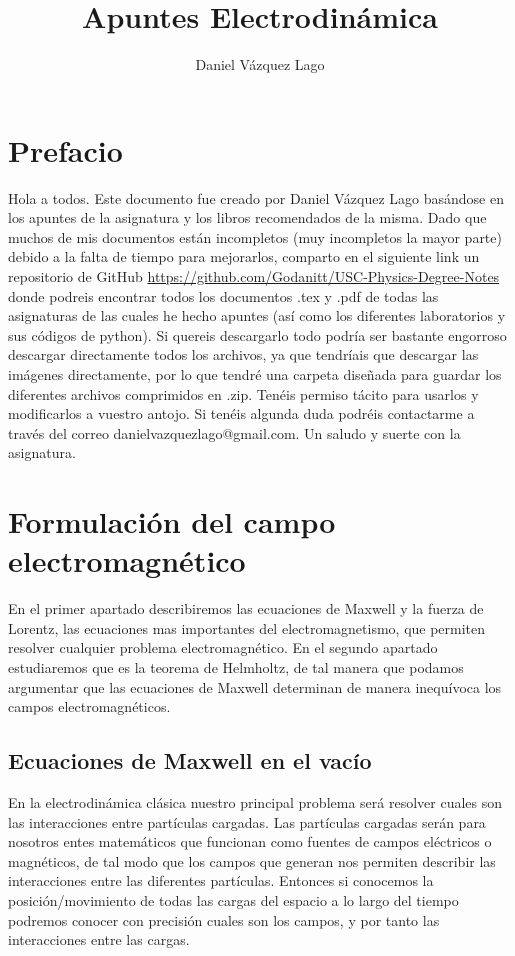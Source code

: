 \documentclass[12pt,a4paper]{article}
\author{Daniel Vázquez Lago}
\title{Apuntes Electrodinámica}
\numberwithin{equation}{section}
\numberwithin{figure}{section}
\begin{document}
\maketitle

\newpage

\tableofcontents

\newpage

\section*{Prefacio}

Hola a todos. Este documento fue creado por Daniel Vázquez Lago basándose en los apuntes de la asignatura y los libros recomendados de la misma. Dado que muchos de mis documentos están incompletos (muy incompletos la mayor parte) debido a la falta de tiempo para mejorarlos, comparto en el siguiente link un repositorio de GitHub \url{https://github.com/Godanitt/USC-Physics-Degree-Notes} donde podreis encontrar todos los documentos .tex y .pdf de todas las asignaturas de las cuales he hecho apuntes (así como los diferentes laboratorios y sus códigos de python). Si quereis descargarlo todo podría ser bastante engorroso descargar directamente todos los archivos, ya que tendríais que descargar las imágenes directamente, por lo que tendré una carpeta diseñada para guardar los diferentes archivos comprimidos en .zip. Tenéis permiso tácito para usarlos y modificarlos a vuestro antojo. Si tenéis algunda duda podréis contactarme a través del correo danielvazquezlago@gmail.com. Un saludo y suerte con la asignatura.


\section{Formulación del campo electromagnético}

En el primer apartado describiremos las ecuaciones de Maxwell y la fuerza de Lorentz, las ecuaciones mas importantes del electromagnetismo, que permiten resolver cualquier problema electromagnético. En el segundo apartado estudiaremos que es la teorema de Helmholtz, de tal manera que podamos argumentar que las ecuaciones de Maxwell determinan de manera inequívoca los campos electromagnéticos. 

\subsection{Ecuaciones de Maxwell en el vacío}


En la electrodinámica clásica nuestro principal problema será resolver cuales son las interacciones entre partículas cargadas. Las partículas cargadas serán para nosotros entes matemáticos que funcionan como fuentes de campos eléctricos o magnéticos, de tal modo que los campos que generan nos permiten describir las interacciones entre las diferentes partículas.  Entonces si conocemos la posición/movimiento de todas las cargas del espacio a lo largo del tiempo podremos conocer con precisión cuales son los campos, y por tanto las interacciones entre las cargas. \\
\end{document}
